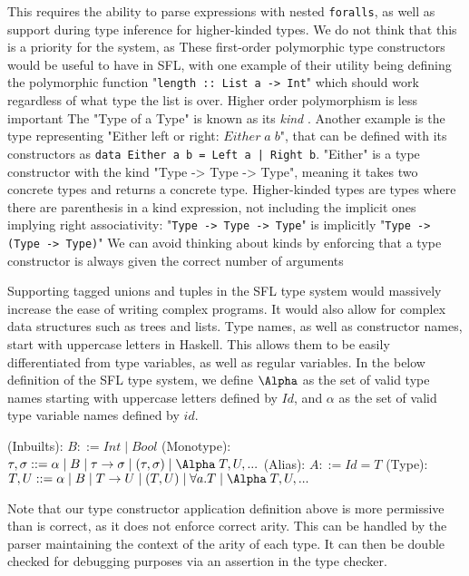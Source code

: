 This requires the ability to parse expressions with nested \verb|foralls|, as well as support during type inference for higher-kinded types. We do not think that this is a priority for the system, as 
These first-order polymorphic type constructors would be useful to have in \ac{SFL}, with one example of their utility being defining the polymorphic function "\verb|length :: List a -> Int|" which should work regardless of what type the list is over. Higher order polymorphism is less important
The "Type of a Type" is known as its \emph{kind} \cite{pierce2002types}. Another example is the type representing "Either left or right: \(Either \;a\;b\)", that can be defined with its constructors as \verb!data Either a b = Left a | Right b!. "Either" is a type constructor with the kind "Type -> Type -> Type", meaning it takes two concrete types and returns a concrete type. 
Higher-kinded types are types where there are parenthesis in a kind expression, not including the implicit ones implying right associativity: 
"\verb|Type -> Type -> Type|" is implicitly "\verb|Type -> (Type -> Type)|"
We can avoid thinking about kinds by enforcing that a type constructor is always given the correct number of arguments

Supporting tagged unions and tuples in the \ac{SFL} type system would massively increase the ease of writing complex programs. It would also allow for complex data structures such as trees and lists. 
Type names, as well as constructor names, start with uppercase letters in Haskell. This allows them to be easily differentiated from type variables, as well as regular variables. 
In the below definition of the \ac{SFL} type system, we define \(\Alpha\) as the set of valid type names starting with uppercase letters defined by \(Id\), and \(\alpha\) as the set of valid type variable names defined by \(id\). 

\begin{syntax}
(Inbuilts): \(B::=Int\mid Bool\)\newline
(Monotype): \(\tau, \sigma ::= \alpha \mid B \mid \tau \rightarrow \sigma \mid (\tau, \sigma) \mid \Alpha \;T, U,...\)\newline
(Alias): \(A ::= Id = T\)\newline
(Type): \(T, U ::= \alpha \mid B \mid T \rightarrow U \mid (T, U) \mid \forall a. T \mid \Alpha \;T, U,...\)
\end{syntax}
Note that our type constructor application definition above is more permissive than is correct, as it does not enforce correct arity. This can be handled by the parser maintaining the context of the arity of each type. It can then be double checked for debugging purposes via an assertion in the type checker. 

